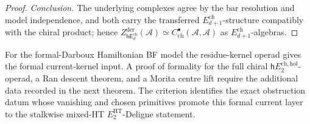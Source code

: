 \begin{proof}
\emph{Conclusion.}  The underlying complexes agree by the bar resolution
and model independence, and both carry the transferred
\(E_{d+1}^{\mathrm{ch}}\)-structure compatibly with the chiral product;
hence \(Z^{\mathrm{der}}_{\mathsf{hE}_d^{\mathrm{ch}}}(\mathcal A)\simeq
C^\bullet_{\mathrm{ch}}(\mathcal A,\mathcal A)\) as
\(E_{d+1}^{\mathrm{ch}}\)-algebras.
\end{proof}

For the formal-Darboux Hamiltonian BF model the residue-kernel operad
gives the formal current-kernel input.  A proof of formality for the
full chiral \(\mathsf hE_2^{\mathrm{ch,hol}}\)-operad, a Ran descent
theorem, and a Morita centre lift require the additional data recorded
in the next theorem.  The criterion identifies the exact obstruction
datum whose vanishing and chosen primitives promote this formal current
layer to the stalkwise mixed-HT \(E_2^{\mathrm{HT}}\)-Deligne statement.

